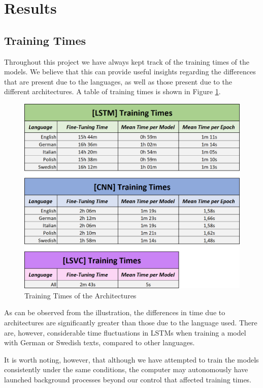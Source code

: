 \documentclass[letterpaper,11pt]{article}
\begin{document}
\section{Results}
\label{sec:results}

\subsection{Training Times}

Throughout this project we have always kept track of the training times of the models. We believe that this can provide useful insights regarding the differences that are present due to the languages, as well as those present due to the different architectures. A table of training times is shown in Figure \ref{fig:training_times}.

\begin{figure}[H]
  \centering
  \includegraphics[width=11.28cm]{fine_tuning_times.png}
  \caption{Training Times of the Architectures}
  \label{fig:training_times}
\end{figure}

As can be observed from the illustration, the differences in time due to architectures are significantly greater than those due to the language used. There are, however, considerable time fluctuations in LSTMs when training a model with German or Swedish texts, compared to other languages. 

It is worth noting, however, that although we have attempted to train the models consistently under the same conditions, the computer may autonomously have launched background processes beyond our control that affected training times.
\end{document}
